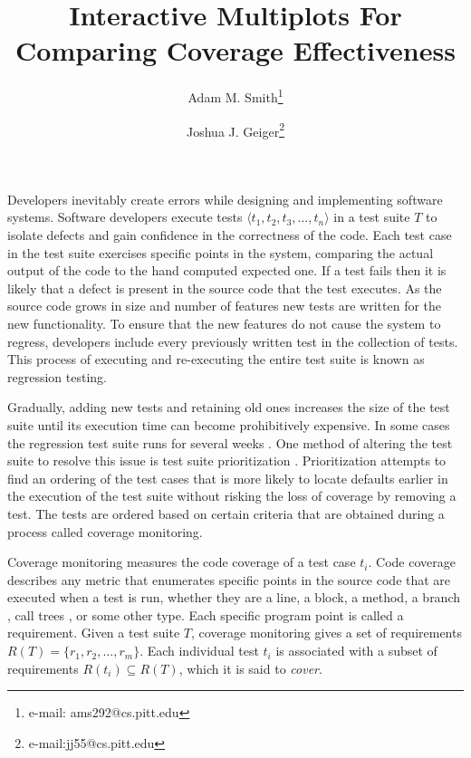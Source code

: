 \documentclass{vgtc}                          %
\title{Interactive Multiplots For Comparing Coverage Effectiveness}
\author{Adam M. Smith\thanks{e-mail: ams292@cs.pitt.edu} %
\and Joshua J. Geiger\thanks{e-mail:jj55@cs.pitt.edu}} %
\affiliation{\scriptsize University of Pittsburgh}
\begin{document}


\maketitle


Developers inevitably create errors while designing and implementing software systems. Software developers execute tests $\langle t_1, t_2, t_3,\ldots, t_n\rangle$ in a test suite $T$ to isolate defects and gain confidence in the correctness of the code.  Each test case in the test suite exercises specific points in the system, comparing the actual output of the code to the hand computed expected one.  If a test fails then it is likely that a defect is present in the source code that the test executes.  As the source code grows in size and number of features new tests are written for the new functionality.  To ensure that the new features do not cause the system to regress, developers include every previously written test in the collection of tests.  This process of executing and re-executing the entire test suite is known as regression testing.  

Gradually, adding new tests and retaining old ones increases the size of the test suite until its execution time can become prohibitively expensive.  In some cases the regression test suite runs for several weeks \cite{empiricalfamily}.  One method of altering the test suite to resolve this issue is test suite prioritization \cite{rothermelprioritizing2001}.  Prioritization attempts to find an ordering of the test cases that is more likely to locate defaults earlier in the execution of the test suite without risking the loss of coverage by removing a test.  The tests are ordered based on certain criteria that are obtained during a process called coverage monitoring.  

Coverage monitoring measures the code coverage of a test case $t_i$.  Code coverage describes any metric that enumerates specific points in the source code that are executed when a test is run, whether they are a line, a block, a method, a branch \cite{zhu}, call trees \cite{smith:2007}, or some other type. Each specific program point is called a requirement.  Given a test suite $T$, coverage monitoring gives a set of requirements $R(T) = \{ r_1, r_2,\ldots,r_m \}$.  Each individual test $t_i$ is associated with a subset of requirements $R(t_i) \subseteq R(T)$, which it is said to \textit{cover}.  
\end{document}
